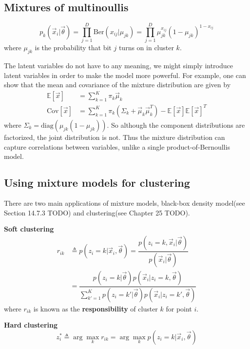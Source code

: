 \subsection{Mixtures of multinoullis}
\begin{equation}
p_k(\vec{x}_i|\vec{\theta})=\prod\limits_{j=1}^D \mathrm{Ber}(x_{ij}|\mu_{jk})=\prod\limits_{j=1}^D \mu_{jk}^{x_{ij}}(1-\mu_{jk})^{1-x_{ij}}
\end{equation}
where $\mu_{jk}$ is the probability that bit $j$ turns on in cluster $k$.

The latent variables do not have to any meaning, we might simply introduce latent variables in order to make the model more powerful. For example, one can show that the mean and covariance of the mixture distribution are given by
\begin{align}
\mathbb{E}[\vec{x}] & = \sum\limits_{k=1}^K \pi_k\vec{\mu}_k \\
\mathrm{Cov}[\vec{x}] & = \sum\limits_{k=1}^K \pi_k(\Sigma_k+\vec{\mu}_k\vec{\mu}_k^T)-\mathbb{E}[\vec{x}]\mathbb{E}[\vec{x}]^T
\end{align}
where $\Sigma_k=\mathrm{diag}(\mu_{jk}(1-\mu_{jk}))$. So although the component distributions are factorized, the joint distribution is not. Thus the mixture distribution can capture correlations between variables, unlike a single product-of-Bernoullis model.




\subsection{Using mixture models for clustering}
There are two main applications of mixture models, black-box density model(see Section 14.7.3 TODO) and clustering(see Chapter 25 TODO).

\textbf{Soft clustering}
\begin{equation}\begin{split}
r_{ik} & \triangleq p(z_i=k|\vec{x}_i,\vec{\theta})=\dfrac{p(z_i=k,\vec{x}_i|\vec{\theta})}{p(\vec{x}_i|\vec{\theta})} \\
       & =\dfrac{p(z_i=k|\vec{\theta})p(\vec{x}_i|z_i=k,\vec{\theta})}{\sum_{k'=1}^K p(z_i=k'|\vec{\theta})p(\vec{x}_i|z_i=k',\vec{\theta})}
\end{split}\end{equation}
where $r_{ik}$ is known as the \textbf{responsibility} of cluster $k$ for point $i$.

\textbf{Hard clustering}
\begin{equation}
z_i^* \triangleq \arg\max_k r_{ik}=\arg\max_k p(z_i=k|\vec{x}_i,\vec{\theta})
\end{equation}

